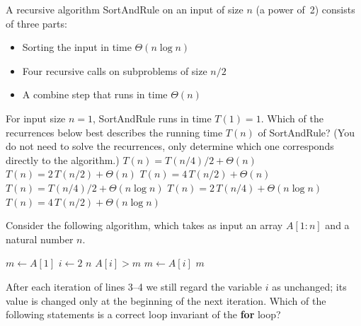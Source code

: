 A recursive algorithm {\sc SortAndRule} on an input of size $n$ (a power of~2) consists of three parts:
\begin{itemize}
    \item Sorting the input in time $\Theta(n \log n)$
    \item Four recursive calls on subproblems of size $n/2$
    \item A combine step that runs in time $\Theta(n)$
\end{itemize}
For input size $n=1$, {\sc SortAndRule} runs in time $T(1)=1$.
Which of the recurrences below best describes the running time $T(n)$ of {\sc SortAndRule}?
(You do not need to solve the recurrences, only determine which one corresponds directly to the algorithm.)
\oneanswer
\optionsstart
\answer $T(n) = T(n/4)/2 + \Theta(n)$
\answer $T(n) = 2\, T(n/2) + \Theta(n)$
\answer $T(n) = 4\, T(n/2) + \Theta(n)$
\answer $T(n) = T(n/4)/2 + \Theta(n \log n)$
\answer $T(n) = 2\, T(n/4) + \Theta(n \log n)$
\answer $T(n) = 4\, T(n/2) + \Theta(n \log n)$\correct
\optionsend
{}


Consider the following algorithm, which takes as input an array $A[1\!:\!n]$ and a natural number $n$.
\begin{codebox}
\li $m \gets A[1]$
\li \For $i \gets 2$ \To $n$
\li \Do \If $A[i] > m$
\li \Then $m \gets A[i]$\End\End
\li \Return $m$
\end{codebox}
After each iteration of lines 3--4 we still regard the variable $i$ as unchanged; its value is changed only at the beginning of the next iteration.
Which of the following statements is a correct loop invariant of the \textbf{for} loop?
\multipleanswers
\optionsstart
{}
\correct
{}\correct
{}\correct
{}
\optionsend
{}



